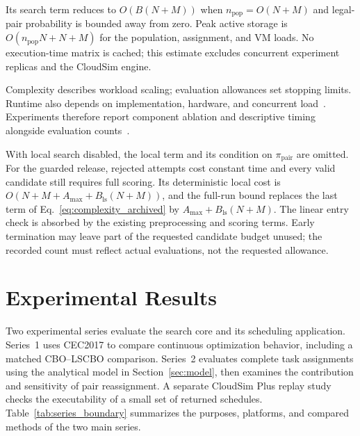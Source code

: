 \documentclass[pdflatex,onecolumn,sn-mathphys-num]{sn-jnl}
\begin{document}
Its search term reduces to $O(B(N+M))$ when $n_{\mathrm{pop}}=O(N+M)$ and legal-pair probability is bounded away from zero. Peak active storage is $O(n_{\mathrm{pop}}N+N+M)$ for the population, assignment, and VM loads. No execution-time matrix is cached; this estimate excludes concurrent experiment replicas and the CloudSim engine.

Complexity describes workload scaling; evaluation allowances set stopping limits. Runtime also depends on implementation, hardware, and concurrent load~\cite{BartzBeielstein2020}. Experiments therefore report component ablation and descriptive timing alongside evaluation counts~\cite{LaTorre2021}.

With local search disabled, the local term and its condition on $\pi_{\mathrm{pair}}$ are omitted. For the guarded release, rejected attempts cost constant time and every valid candidate still requires full scoring. Its deterministic local cost is $O(N+M+A_{\max}+B_{\mathrm{ls}}(N+M))$, and the full-run bound replaces the last term of Eq.~\eqref{eq:complexity_archived} by $A_{\max}+B_{\mathrm{ls}}(N+M)$. The linear entry check is absorbed by the existing preprocessing and scoring terms. Early termination may leave part of the requested candidate budget unused; the recorded count must reflect actual evaluations, not the requested allowance.

\FloatBarrier


\section{Experimental Results}\label{sec5}

Two experimental series evaluate the search core and its scheduling application. Series~1 uses CEC2017 to compare continuous optimization behavior, including a matched CBO--LSCBO comparison. Series~2 evaluates complete task assignments using the analytical model in Section~\ref{sec:model}, then examines the contribution and sensitivity of pair reassignment. A separate CloudSim Plus replay study checks the executability of a small set of returned schedules. Table~\ref{tab:series_boundary} summarizes the purposes, platforms, and compared methods of the two main series.
\end{document}

